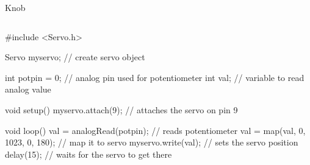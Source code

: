 \documentclass[compress]{beamer}
\begin{document}
\begin{frame}[fragile]{Knob}
    \begin{columns}
        \begin{column}{0.7\linewidth}
\begin{cppcode}

#include <Servo.h>

Servo myservo;  // create servo object

int potpin = 0;  // analog pin used for potentiometer
int val;    // variable to read analog value

void setup() {
  myservo.attach(9);  // attaches the servo on pin 9
}

void loop() {
  val = analogRead(potpin); // reads potentiometer
  val = map(val, 0, 1023, 0, 180); // map it to servo
  myservo.write(val); // sets the servo position
  delay(15); // waits for the servo to get there
}

\end{cppcode}


\end{column}
\end{columns}
\end{frame}
\end{document}
